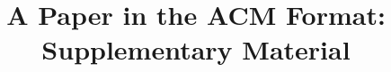\documentclass[sigconf,nonacm]{acmart}
\begin{document}
\title{A Paper in the ACM Format: Supplementary Material}


\begin{abstract}

\end{abstract}

\maketitle

\appendix





\end{document}
